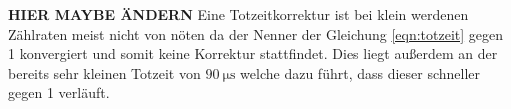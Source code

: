 \textbf{HIER MAYBE ÄNDERN}
Eine Totzeitkorrektur ist bei klein werdenen Zählraten meist nicht von nöten da der Nenner der Gleichung \eqref{eqn:totzeit} gegen 1 konvergiert und somit keine
Korrektur stattfindet. Dies liegt außerdem an der bereits sehr kleinen Totzeit von $\SI{90}{\micro\second}$ welche dazu führt, dass dieser schneller gegen 1 verläuft.
